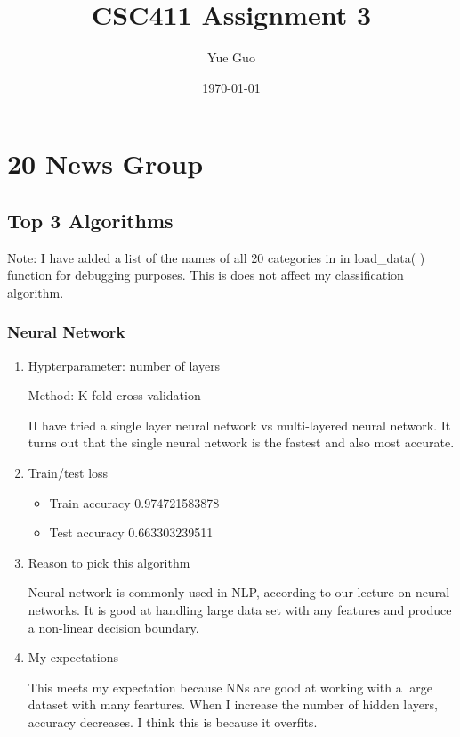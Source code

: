 \documentclass[letterpaper, 12pt]{article}
\date{\today}
\title{CSC411 Assignment 3}
\author{Yue Guo}
\begin{document}
\maketitle

\section{20 News Group}
\subsection{Top 3 Algorithms}
Note: I have added a list of the names of all 20 categories in in load\_data( ) function for debugging purposes. This is does not affect my classification algorithm.

\subsubsection{Neural Network}
\begin{enumerate}

    \item Hypterparameter: number of layers
    
	Method: K-fold cross validation
	
	II have tried a single layer neural network vs multi-layered neural network.  It turns out that the single neural network is the fastest and also most accurate.

	\item Train/test loss
	\begin{itemize}
	
     \item  Train accuracy 0.974721583878
     \item Test accuracy 0.663303239511
        \end{itemize}
      
      \item Reason to pick this algorithm
      
      Neural network is commonly used in NLP, according to our lecture on neural networks. It is good at handling large data set with any features and produce a non-linear decision boundary.  
        
      \item My expectations
      
      This meets my expectation because NNs are good at working with a large dataset with many feartures. When I increase the number of hidden layers, accuracy decreases. I think this is because it overfits.
  
\end{enumerate}
\end{document}

